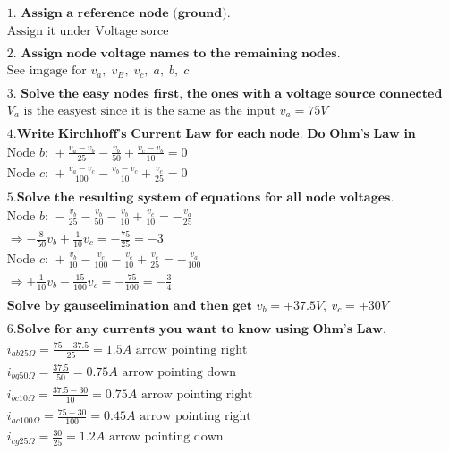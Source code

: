 \begin{align*}
  &\quad 1. \textbf{ Assign a reference node (ground).} \\
  &\quad \text{Assign it under Voltage sorce} \\
  &\quad \\
  &\quad 2. \textbf{ Assign node voltage names to the remaining nodes.} \\
  &\quad \text{See imgage for } v_a, \; v_B, \; v_c, \; a, \; b, \; c  \\
  &\quad \\
  &\quad 3. \textbf{ Solve the easy nodes first, the ones with a voltage source connected to the reference node.} \\
  &\quad V_a \text{ is the easyest since it is the same as the input } v_a=75V \\
  &\quad \\
  &\quad 4. \textbf{Write Kirchhoff's Current Law for each node. Do Ohm's Law in your head.} \\
  &\quad \text{Node $b$: } +\frac{v_a-v_b}{25} -\frac{v_b}{50} +\frac{v_c-v_b}{10} = 0 \\
  &\quad \text{Node $c$: } +\frac{v_a-v_c}{100} -\frac{v_b-v_c}{10} +\frac{v_c}{25} = 0 \\
  &\quad \\
  &\quad 5. \textbf{Solve the resulting system of equations for all node voltages.} \\
  &\quad \text{Node $b$: } -\frac{v_b}{25} -\frac{v_b}{50} -\frac{v_b}{10} +\frac{v_c}{10} = -\frac{v_a}{25} \\
  &\quad \Rightarrow -\frac{8}{50}v_b +\frac{1}{10}v_c = -\frac{75}{25} = -3 \\
  &\quad \text{Node $c$: } +\frac{v_b}{10} -\frac{v_c}{100} -\frac{v_c}{10} +\frac{v_c}{25} = -\frac{v_a}{100} \\
  &\quad \Rightarrow +\frac{1}{10}v_b -\frac{15}{100}v_c = -\frac{75}{100} = -\frac{3}{4} \\
  &\quad \\
  &\quad \textbf{Solve by gauseelimination and then get } v_b=+37.5V, \: v_c=+30V \\
  &\quad \\
  &\quad 6. \textbf{Solve for any currents you want to know using Ohm's Law.} \\
  &\quad i_{ab25\Omega} = \frac{75-37.5}{25} = 1.5A  \text{ arrow pointing right} \\
  &\quad i_{bg50\Omega} = \frac{37.5}{50} = 0.75A    \text{ arrow pointing down} \\
  &\quad i_{bc10\Omega} = \frac{37.5-30}{10} = 0.75A \text{ arrow pointing right} \\
  &\quad i_{ac100\Omega} = \frac{75-30}{100} = 0.45A \text{ arrow pointing right} \\
  &\quad i_{cg25\Omega} = \frac{30}{25} = 1.2A       \text{ arrow pointing down} \\
  &\quad \\
\end{align*}

